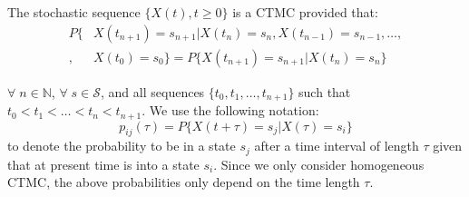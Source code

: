 \begin{definition}
The stochastic sequence $\{X(t), t\geq 0 \}$ is a CTMC provided that:
\begin{equation}
\begin{split}
P\{&X(t_{n+1}) = s_{n+1} \vert X(t_{n}) = s_{n}, X(t_{n-1}) = s_{n-1}, \ldots,\\ 
,&X(t_0) = s_0\} =P\{X(t_{n+1}) = s_{n+1} \vert X(t_{n}) = s_{n}\}
\end{split}
\label{stoch:BG.eq.CTMC}
\end{equation}
\end{definition}
$\forall \; n\in \mathbb{N}$, $\forall \; s\in \mathcal{S}$, and all sequences $\{t_0,t_1,\ldots,t_{n+1}\}$ such that $t_0 < t_1 < \ldots <  t_{n} <  t_{n+1}$.
We use the following notation:
\begin{equation}
p_{ij}(\tau) = P\{X(t+\tau) = s_j \vert X(\tau) = s_i\}
\end{equation}
to denote the probability to be in a state $s_j$ after a time interval of length $\tau$ given that at present time is into a state $s_i$. Since we only consider homogeneous CTMC, the above probabilities only depend on the time length $\tau$.

